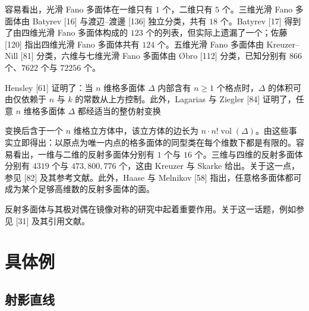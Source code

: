 容易看出，光滑 Fano 多面体在一维只有 $1$ 个，二维只有 $5$ 个。三维光滑 Fano 多面体由 Batyrev [16] 与渡辺–渡邊 [136] 独立分类，共有 $18$ 个。Batyrev [17] 得到了由四维光滑 Fano 多面体构成的 $123$ 个的列表，但实际上遗漏了一个；佐藤 [120] 指出四维光滑 Fano 多面体共有 $124$ 个。五维光滑 Fano 多面体由 Kreuzer–Nill [81] 分类，六维与七维光滑 Fano 多面体由 Øbro [112] 分类，已知分别有 $866$ 个、$7622$ 个与 $72256$ 个。

Hensley [61] 证明了：当 $n$ 维格多面体 $\Delta$ 内部含有 $n\ge 1$ 个格点时，$\Delta$ 的体积可由仅依赖于 $n$ 与 $k$ 的常数从上方控制。此外，Lagarias 与 Ziegler [84] 证明了，任意 $n$ 维格多面体 $\Delta$ 都经适当的整仿射变换


变换后含于一个 $n$ 维格立方体中，该立方体的边长为 $n\cdot n!\operatorname{vol}(\Delta)$。由这些事实立即得出：以原点为唯一内点的格多面体的同型类在每个维数下都是有限的。容易看出，一维与二维的反射多面体分别有 $1$ 个与 $16$ 个。三维与四维的反射多面体分别有 $4319$ 个与 $473{,}800{,}776$ 个，这由 Kreuzer 与 Skarke 给出。关于这一点，参见 [82] 及其参考文献。此外，Haase 与 Melnikov [58] 指出，任意格多面体都可成为某个足够高维数的反射多面体的面。

反射多面体与其极对偶在镜像对称的研究中起着重要作用。关于这一话题，例如参见 [31] 及其引用文献。

\section{具体例}

\subsection{射影直线}

